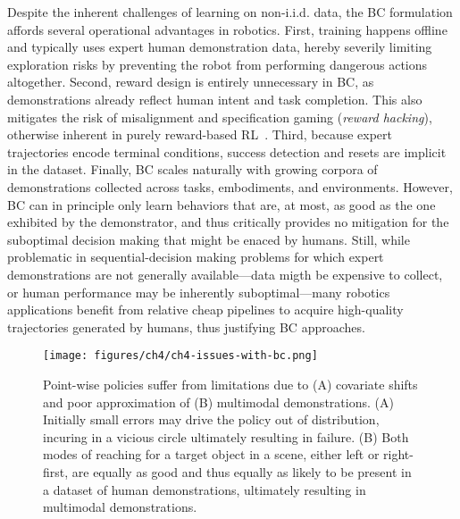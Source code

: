 Despite the inherent challenges of learning on non-i.i.d. data, the BC formulation affords several operational advantages in robotics.
First, training happens offline and typically uses expert human demonstration data, hereby severily limiting exploration risks by preventing the robot from performing dangerous actions altogether.
Second, reward design is entirely unnecessary in BC, as demonstrations already reflect human intent and task completion.
This also mitigates the risk of misalignment and specification gaming (\emph{reward hacking}), otherwise inherent in purely reward-based RL~\citep{heessEmergenceLocomotionBehaviours2017}.
Third, because expert trajectories encode terminal conditions, success detection and resets are implicit in the dataset.
Finally, BC scales naturally with growing corpora of demonstrations collected across tasks, embodiments, and environments.
However, BC can in principle only learn behaviors that are, at most, as good as the one exhibited by the demonstrator, and thus critically provides no mitigation for the suboptimal decision making that might be enaced by humans.
Still, while problematic in sequential-decision making problems for which expert demonstrations are not generally available---data migth be expensive to collect, or human performance may be inherently suboptimal---many robotics applications benefit from relative cheap pipelines to acquire high-quality trajectories generated by humans, thus justifying BC approaches.

\begin{figure}
    \centering
    \texttt{[image: figures/ch4/ch4-issues-with-bc.png]}
    \caption{Point-wise policies suffer from limitations due to (A) covariate shifts and poor approximation of (B) multimodal demonstrations. (A) Initially small errors may drive the policy out of distribution, incuring in a vicious circle ultimately resulting in failure. (B) Both modes of reaching for a target object in a scene, either left or right-first, are equally as good and thus equally as likely to be present in a dataset of human demonstrations, ultimately resulting in multimodal demonstrations.}
    \label{fig:ch4-issues-with-bc}
\end{figure}

